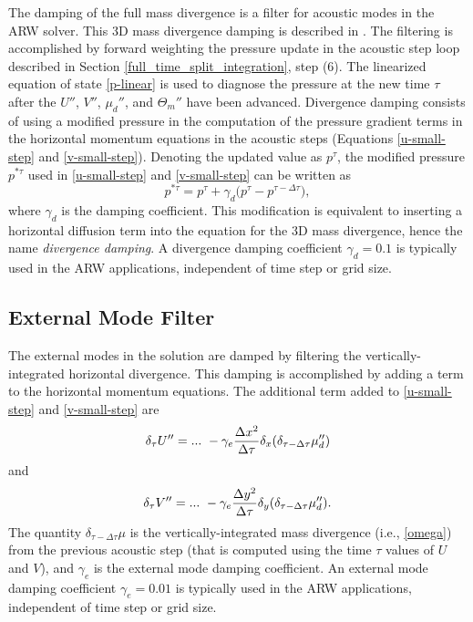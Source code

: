 The damping of the full mass divergence is a filter for acoustic
modes in the ARW solver.  This 3D mass divergence damping is described
in \citet{skamarock92}.  The filtering is accomplished by
forward weighting the pressure update in the acoustic step loop
described in Section \ref{full_time_split_integration}, step (6).  The linearized equation of
state \eqref{p-linear} is used to diagnose the pressure at the new time $\tau$
after the $U''$, $V''$, $\mu_d''$, and $\Theta_m''$ have
been advanced.  Divergence damping consists of using a modified pressure
in the computation of the pressure gradient terms in the horizontal
momentum equations in the acoustic steps (Equations \eqref{u-small-step}
and \eqref{v-small-step}).  Denoting the updated value as $p^\tau$, 
the modified pressure $p^{*\tau}$ used in \eqref{u-small-step}
and \eqref{v-small-step}
can be written as
%
\begin{equation}
p^{*\tau} = 
{p}^{\tau} + \gamma_d \bigl(
{p}^{\tau} -
{p}^{\tau - \Delta \tau}
\bigr),
\end{equation}
%
\noindent
where $\gamma_d$ is the damping coefficient.  
This modification is equivalent to inserting a horizontal 
diffusion term into the equation for the 3D mass divergence,
hence the name {\em divergence damping}.
A divergence damping coefficient $\gamma_d = 0.1$ is
typically used in the ARW
applications, independent of time step or grid size.

\subsection{External Mode Filter}

The external modes in the solution are damped by filtering
the vertically-integrated horizontal divergence.
This damping is accomplished by
adding a term to the horizontal momentum equations.  The additional
term added to \eqref{u-small-step} and \eqref{v-small-step} are
%
\begin{equation}
\delta_\tau U'' = ... \,\,
- \gamma_e {\Delta x^2 \over \Delta \tau} \delta_x (\delta_{\tau-\Delta \tau} \mu_d'')
\end{equation}
\noindent 
and
\begin{equation}
\delta_\tau V'' = ... \,\, 
- \gamma_e {\Delta y^2 \over \Delta \tau} \delta_y (\delta_{\tau-\Delta \tau} \mu_d'').
\end{equation}
%
\noindent
The quantity $\delta_{\tau - \Delta \tau} \mu $ is the vertically-integrated 
mass divergence (i.e., \eqref{omega}) from the previous
acoustic step (that is computed using
the time $\tau$ values of $U$ and $V$), and
$\gamma_e$ is the external mode damping coefficient.  An external mode
damping coefficient $\gamma_e = 0.01$  is typically used in the ARW
applications, independent of time step or grid size.

